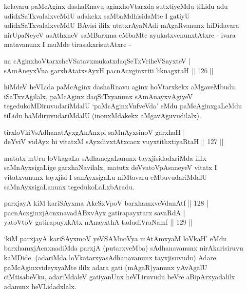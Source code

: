 \begin{artha}
kelavaru paMcAginx dashaRnavu aginxhoVtarxda sutxtiyeMdu tiLidu adu
udidxSaTxvalalxveMdU adakekx saMbaMdhisidaMte I gatiyU
udidxSaTxvalalxveMdU BAvisi ililx utatxrAyaNAdi mAgaRvanunx hiDidavara
nirUpaNeyeV asAthxneV saMBarxma eMbaMte ayukatxvenunxtAtxre - ivara
matavanunx I muMde tirasakxrisutAtxre -
\end{artha}

\begin{shl}
na cAginxhoVtarxsheVSatavxmukatxdaqSeTxVriheVSayxteV | \\
sAmAneyxVna garxhAtatxsAyxH pacnAcxginxriti liknagxtaH \hfill|| 126 || 
\end{shl}

\begin{artha}
hiMdeV heVLida paMcAginx dashaRnavu aginx hoVtarxkekx aMgaveMbudu
iSaTxvAgilalx, paMcAginx daqSiTxyanunx sAmAnayxvAgiyeV
tegedukoMDiruvudariMdalU `paMcAginxVnfveVda' eMdu paMcAginxgaLeMdu
tiLidu baMdiruvudariMdalU (inonxMdakekx aMgavAguvudilalx).
\end{artha}

\begin{shl}
tirxloVkiVsAdhanatAyxgAnAnxpi saMnAyxsinoV garxhaH | \\
deYviV vidAyx hi vitatxM sAyxdivxtAtxcacx vuyxtithxtiyaRtaH \hfill|| 127 || 
\end{shl}

\begin{artha}
matutx mUru loVkagaLa sAdhanegaLanunx tayxjisidadxriMda ililx
saMnAyxsigaLige garxhaNavilalx, matutx deVvatoVpAsaneyeV vitatx I
vitatxvanunx tayxjisi I sanAyxsigaLu niMtavaru eMbuvudariMdalU
saMnAyxsigaLanunx tegedukoLaLxbAradu.
\end{artha}


\begin{shl}
parxjayA kiM kariSAyxma AkeSxVpoV barxhamxveVdanAtf \hfill|| 128 | \\
pacnAcxginxjAcnxnavadABxvAyx gatirapayxtarx savaRdA | \\
yatoV\s toV gatirapuyxkAtx nAnayxthA tadudiVraNamf \hfill|| 129 || 
\end{shl}

\begin{artha}
`kiM parxjayA kariSAyxmoV yeVSAMnoV\s ya mAtAmxyaM loVkaH' eMdu barxhamxjAcnxnadiMda parxjA (putarxveMba) sAdhanavanunx  nirAkarisiruvu kaMDide. (adariMda loVkatarxyasAdhanavanunx  tayxjisuvudu) Adare paMcAginxvideyxyaMte ililx adara gati  (mAgaR)yanunx yAvAgalU ciMtisabeVku, adariMdaleV gatiyanUnx  heVLiruvudu beVre aBipArxyadalilx adanunx heVLidadxlalx.
\end{artha}

